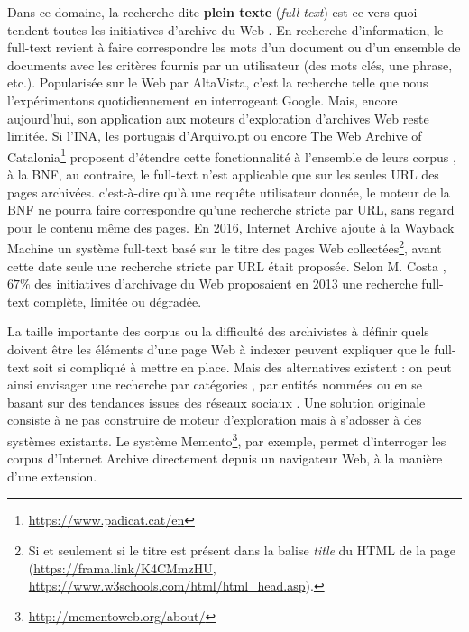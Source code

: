 \documentclass[symmetric,justified,marginals=raggedouter]{tufte-book}
\begin{document}
Dans ce domaine, la recherche dite \textbf{plein texte} (\textit{full-text}) est ce vers quoi tendent toutes les initiatives d'archive du Web \citep{costa_characterizing_2011,costa_evaluating_2012}. En recherche d'information, le full-text revient à faire correspondre les mots d'un document ou d'un ensemble de documents avec les critères fournis par un utilisateur (des mots clés, une phrase, etc.). Popularisée sur le Web par AltaVista, c'est la recherche telle que nous l'expérimentons quotidiennement en interrogeant Google. Mais, encore aujourd'hui, son application aux moteurs d'exploration d'archives Web reste limitée. Si l'INA, les portugais d'Arquivo.pt ou encore The Web Archive of Catalonia\footnote{\RaggedOuter \url{https://www.padicat.cat/en}} proposent d'étendre cette fonctionnalité à l'ensemble de leurs corpus \citep{stack_full_2006}, à la BNF, au contraire, le full-text n'est applicable que sur les seules URL des pages archivées. c'est-à-dire qu'à une requête utilisateur donnée, le moteur de la BNF ne pourra faire correspondre qu'une recherche stricte par URL, sans regard pour le contenu même des pages. En 2016, Internet Archive ajoute à la Wayback Machine un système full-text basé sur le titre des pages Web collectées\footnote{\RaggedOuter Si et seulement si le titre est présent dans la balise \textit{title} du HTML de la page (\url{https://frama.link/K4CMmzHU}, \url{https://www.w3schools.com/html/html_head.asp}).}, avant cette date seule une recherche stricte par URL était proposée. Selon M. Costa \citep{costa_survey_2013}, $67\%$ des initiatives d'archivage du Web proposaient en 2013 une recherche full-text complète, limitée ou dégradée. 

La taille importante des corpus ou la difficulté des archivistes à définir quels doivent être les éléments d'une page Web à indexer peuvent expliquer que le full-text soit si compliqué à mettre en place. Mais des alternatives existent : on peut ainsi envisager une recherche par catégories \citep{holzmann_tempas:_2016}, par entités nommées \citep{spaniol_tracking_2012} ou en se basant sur des tendances issues des réseaux sociaux \citep{risse_arcomem_2014}. Une solution originale consiste à ne pas construire de moteur d'exploration mais à s'adosser à des systèmes existants. Le système Memento\footnote{\RaggedOuter \url{http://mementoweb.org/about/}}, par exemple, permet d'interroger les corpus d'Internet Archive directement depuis un navigateur Web, à la manière d'une extension. 
\end{document}
